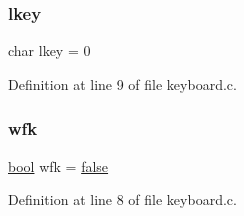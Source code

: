 \subsubsection{\texorpdfstring{lkey}{lkey}}
{\footnotesize\ttfamily char lkey = 0}



Definition at line 9 of file keyboard.\+c.

\mbox{\label{a00032_a6ddd5223379778858edc46ffbec19775_a6ddd5223379778858edc46ffbec19775}} 
\subsubsection{\texorpdfstring{wfk}{wfk}}
{\footnotesize\ttfamily \hyperlink{a00134_af6a258d8f3ee5206d682d799316314b1_af6a258d8f3ee5206d682d799316314b1}{bool} wfk = \hyperlink{a00134_af6a258d8f3ee5206d682d799316314b1_af6a258d8f3ee5206d682d799316314b1ae9de385ef6fe9bf3360d1038396b884c}{false}}



Definition at line 8 of file keyboard.\+c.

